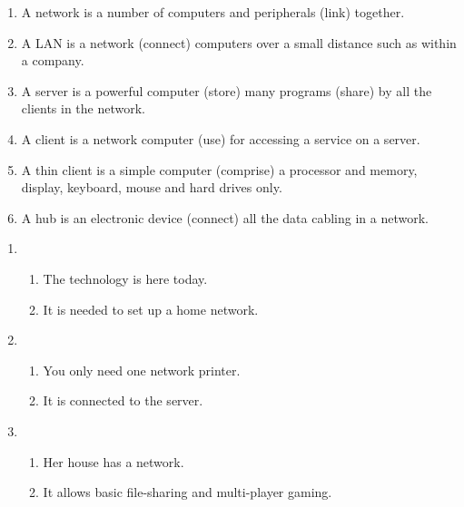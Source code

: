 \documentclass[a4paper]{article}
\begin{document}
\begin{enumerate}[label={\textbf{\Roman*.}},leftmargin=0pt,itemindent=*]
\begin{enumerate}[label=\arabic*.,itemsep=0pt]
      \item A network is a number of computers and peripherals (link) together.

      \item A LAN is a network (connect) computers over a small distance such as
        within a company.

      \item A server is a powerful computer (store) many programs (share) by all
        the clients in the network.

      \item A client is a network computer (use) for accessing a service on a
        server.

      \item A thin client is a simple computer (comprise) a processor and
        memory, display, keyboard, mouse and hard drives only.

      \item A hub is an electronic device (connect) all the data cabling in a
        network.

    \end{enumerate}


    \vspace{-0.5ex}

    \begin{enumerate}[label=\arabic*.,itemsep=0pt]

      \item \begin{enumerate}[label=\alph*)]
        \item The technology is here today.
        \item It is needed to set up a home network.
      \end{enumerate}

      \item \begin{enumerate}[label=\alph*)]
        \item You only need one network printer.
        \item It is connected to the server.
      \end{enumerate}

      \item \begin{enumerate}[label=\alph*)]
        \item Her house has a network.
        \item It allows basic file-sharing and multi-player gaming.
      \end{enumerate}


\end{enumerate}
\end{enumerate}
\end{document}

